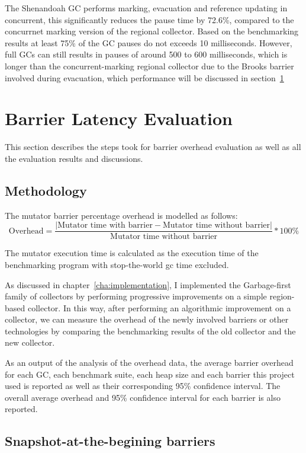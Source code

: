 The Shenandoah GC performs marking, evacuation and reference updating in concurrent,
this significantly reduces the pause time by 72.6\%, compared to the concurrnet marking version
of the regional collector. Based on the benchmarking results at least 75\% of
the GC pauses do not exceeds 10 milliseconds. However, full GCs can still results
in pauses of around 500 to 600 milliseconds, which is longer than the concurrent-marking
regional collector due to the Brooks barrier involved during evacuation, which performance
will be discussed in section~\ref{sec:barrierlatency}

\section{Barrier Latency Evaluation} %
\label{sec:barrierlatency}

This section describes the steps took for barrier overhead evaluation as well as
all the evaluation results and discussions.

\subsection{Methodology}

The mutator barrier percentage overhead is modelled as follows:
$$
\text{Overhead} = \frac{|\text{Mutator time with barrier} - \text{Mutator time without barrier}|}{\text{Mutator time without barrier}} * 100\%
$$

The mutator execution time is calculated as the execution time of the benchmarking program with
stop-the-world gc time excluded.

As discussed in chapter~\ref{cha:implementation}, I implemented the Garbage-first
family of collectors by performing progressive improvements on a simple region-based collector.
In this way, after performing an algorithmic improvement on a collector, we can measure the overhead of
the newly involved barriers or other technologies by comparing the benchmarking results
of the old collector and the new collector.

As an output of the analysis of the overhead data, the average barrier overhead
for each GC, each benchmark suite, each heap size and each barrier this project used is reported
as well as their corresponding 95\% confidence interval.
The overall average overhead and 95\% confidence interval for each barrier is also reported.

\subsection{Snapshot-at-the-begining barriers}

